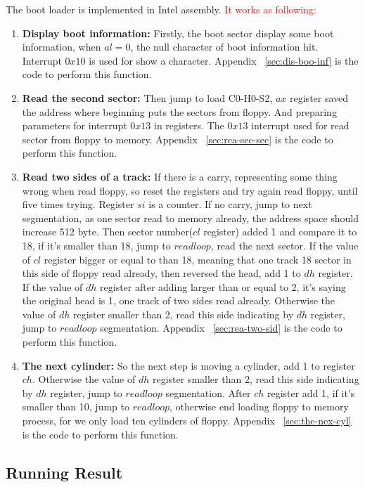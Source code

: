 \documentclass{swfcthesis}
\begin{document}
The boot loader is implemented in Intel assembly. \textcolor{red}{It works as following:}

\begin{enumerate}
\item \textbf{Display boot information:} Firstly, the boot sector display some boot information,
  when $al=0$, the null character of boot information hit. Interrupt $0x10$ is used for
  show a character. Appendix ~\ref{sec:dis-boo-inf} is the code to perform this function.
\item \textbf{Read the second sector:} Then jump to load C0-H0-S2, $ax$ register saved the address
  where beginning puts the sectors from floppy. And preparing parameters for interrupt
  $0x13$ in registers. The $0x13$ interrupt used for read sector from floppy to
  memory. Appendix ~\ref{sec:rea-sec-sec} is the code to perform this function.
\item \textbf{Read two sides of a track:} If there is a carry, representing some thing wrong when
  read floppy, so reset the registers and try again read floppy, until five times
  trying. Register $si$ is a counter. If no carry, jump to next segmentation, as one
  sector read to memory already, the address space should increase 512 byte. Then sector
  number($cl$ register) added 1 and compare it to 18, if it's smaller than 18, jump to
  $readloop$, read the next sector. If the value of $cl$ register bigger or equal to than
  18, meaning that one track 18 sector in this side of floppy read already, then reversed
  the head, add 1 to $dh$ register. If the value of $dh$ register after adding larger than
  or equal to 2, it's saying the original head is 1, one track of two sides read
  already. Otherwise the value of $dh$ register smaller than 2, read this side indicating
  by $dh$ register, jump to $readloop$ segmentation. Appendix ~\ref{sec:rea-two-sid} is
  the code to perform this function.
\item \textbf{The next cylinder:} So the next step is moving a cylinder, add 1 to register
  $ch$. Otherwise the value of $dh$ register smaller than 2, read this side indicating by
  $dh$ register, jump to $readloop$ segmentation. After $ch$ register add 1, if it's
  smaller than 10, jump to $readloop$, otherwise end loading floppy to memory process, for
  we only load ten cylinders of floppy. Appendix ~\ref{sec:the-nex-cyl} is the code to
  perform this function.
\end{enumerate}

\subsection{Running Result}
\label{sec:running-result}
\end{document}
